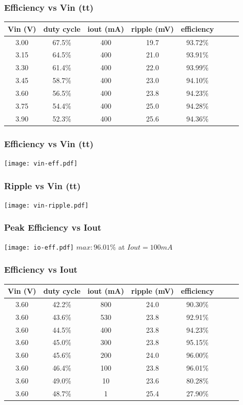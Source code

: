 \documentclass{beamer}
\begin{document}
\begin{frame}
  \frametitle{Efficiency vs Vin (tt) }
    \begin{tabular}{| c | c | c | c | c | c | c | c |}
        \hline
            Vin (V)  &  duty cycle &  iout (mA) &   ripple (mV) & efficiency\\\hline
            3.00 &   67.5\% &      400 &    19.7 &       93.72\%\\\hline
            3.15 &   64.5\% &      400 &    21.0 &       93.91\%\\\hline
            3.30 &   61.4\% &      400 &    22.0 &       93.99\%\\\hline
            3.45 &   58.7\% &      400 &    23.0 &       94.10\%\\\hline
            3.60 &   56.5\% &      400 &    23.8 &       94.23\%\\\hline
            3.75 &   54.4\% &      400 &    25.0 &       94.28\%\\\hline
            3.90 &   52.3\% &      400 &    25.6 &       94.36\%\\\hline
    \end{tabular}
\end{frame}

\begin{frame}
  \frametitle{Efficiency vs Vin (tt) }
  \texttt{[image: vin-eff.pdf]}
\end{frame}

\begin{frame}
  \frametitle{Ripple vs Vin (tt)}
  \texttt{[image: vin-ripple.pdf]}
\end{frame}

\begin{frame}
  \frametitle{Peak Efficiency vs Iout}
  \texttt{[image: io-eff.pdf]}
  $max: 96.01\%$ at $Iout = 100 mA$
\end{frame}

\begin{frame}
  \frametitle{Efficiency vs Iout}
    \begin{tabular}{| c | c | c | c | c | c | c | c |}
        \hline
            Vin (V) &    duty cycle &   iout (mA) &   ripple (mV) & efficiency\\\hline
            3.60 &   42.2\% &800 &    24.0 &      90.30\%\\\hline
            3.60 &   43.6\% &530 &    23.8 &      92.91\%\\\hline
            3.60 &   44.5\% &400 &    23.8 &      94.23\%\\\hline
            3.60 &   45.0\% &300 &    23.8 &      95.15\%\\\hline
            3.60 &   45.6\% &200 &    24.0 &      96.00\%\\\hline
            3.60 &   46.4\% &100 &    23.8 &      96.01\%\\\hline
            3.60 &   49.0\% &10  &    23.6 &      80.28\%\\\hline
            3.60 &   48.7\% &1   &    25.4 &      27.90\%\\\hline
    \end{tabular}
\end{frame}
\end{document}
